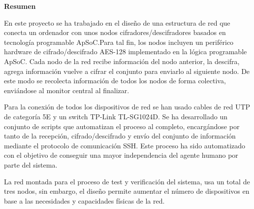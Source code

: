 \begin{center}
	\bigskip
	\bigskip
	\textbf{\huge {Resumen}}\\
	\bigskip
\end{center}

	En este proyecto se ha trabajado en el diseño de una estructura de red que conecta un ordenador con unos nodos cifradores/descifradores basados en tecnología programable ApSoC.Para tal fin, los nodos incluyen un periférico hardware de cifrado/descifrado AES-128 implementado en la lógica programable ApSoC. Cada nodo de la red recibe información del nodo anterior, la descifra, agrega información  vuelve a cifrar el conjunto para enviarlo al siguiente nodo. De este modo se recolecta información de todos los nodos de forma colectiva, enviándose al monitor central al finalizar.
	
	Para la conexión de todos los dispositivos de red se han usado cables de red UTP de categoría 5E y un switch TP-Link TL-SG1024D. Se ha desarrollado un conjunto de scripts que automatizan el proceso al completo, encargándose por tanto de la recepción, cifrado/descifrado y envío del conjunto de información mediante el protocolo de comunicación SSH. Este proceso ha sido automatizado con el objetivo de conseguir una mayor independencia del agente humano por parte del sistema.
	
	La red montada para el proceso de test y verificación del sistema, usa un total de tres nodos, sin embargo, el diseño permite aumentar el número de dispositivos en base a las necesidades y capacidades físicas de la red.